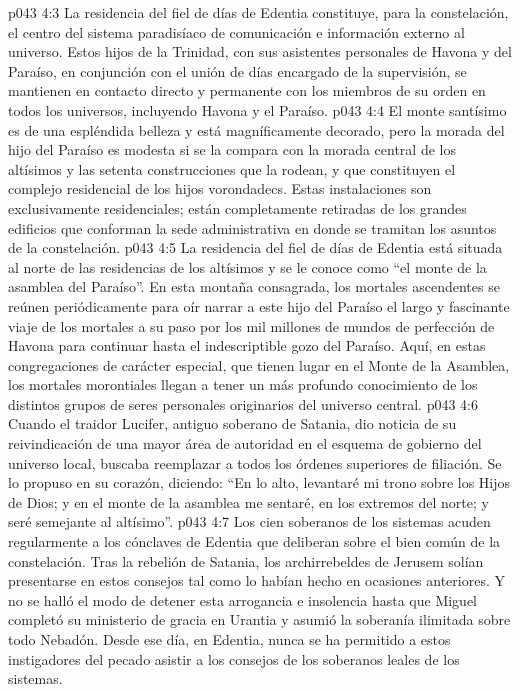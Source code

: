 \vs p043 4:3 La residencia del fiel de días de Edentia constituye, para la constelación, el centro del sistema paradisíaco de comunicación e información externo al universo. Estos hijos de la Trinidad, con sus asistentes personales de Havona y del Paraíso, en conjunción con el unión de días encargado de la supervisión, se mantienen en contacto directo y permanente con los miembros de su orden en todos los universos, incluyendo Havona y el Paraíso.
\vs p043 4:4 El monte santísimo es de una espléndida belleza y está magníficamente decorado, pero la morada del hijo del Paraíso es modesta si se la compara con la morada central de los altísimos y las setenta construcciones que la rodean, y que constituyen el complejo residencial de los hijos vorondadecs. Estas instalaciones son exclusivamente residenciales; están completamente retiradas de los grandes edificios que conforman la sede administrativa en donde se tramitan los asuntos de la constelación.
\vs p043 4:5 La residencia del fiel de días de Edentia está situada al norte de las residencias de los altísimos y se le conoce como “el monte de la asamblea del Paraíso”. En esta montaña consagrada, los mortales ascendentes se reúnen periódicamente para oír narrar a este hijo del Paraíso el largo y fascinante viaje de los mortales a su paso por los mil millones de mundos de perfección de Havona para continuar hasta el indescriptible gozo del Paraíso. Aquí, en estas congregaciones de carácter especial, que tienen lugar en el Monte de la Asamblea, los mortales morontiales llegan a tener un más profundo conocimiento de los distintos grupos de seres personales originarios del universo central.
\vs p043 4:6 Cuando el traidor Lucifer, antiguo soberano de Satania, dio noticia de su reivindicación de una mayor área de autoridad en el esquema de gobierno del universo local, buscaba reemplazar a todos los órdenes superiores de filiación. Se lo propuso en su corazón, diciendo: “En lo alto, levantaré mi trono sobre los Hijos de Dios; y en el monte de la asamblea me sentaré, en los extremos del norte; y seré semejante al altísimo”.
\vs p043 4:7 \pc Los cien soberanos de los sistemas acuden regularmente a los cónclaves de Edentia que deliberan sobre el bien común de la constelación. Tras la rebelión de Satania, los archirrebeldes de Jerusem solían presentarse en estos consejos tal como lo habían hecho en ocasiones anteriores. Y no se halló el modo de detener esta arrogancia e insolencia hasta que Miguel completó su ministerio de gracia en Urantia y asumió la soberanía ilimitada sobre todo Nebadón. Desde ese día, en Edentia, nunca se ha permitido a estos instigadores del pecado asistir a los consejos de los soberanos leales de los sistemas.

